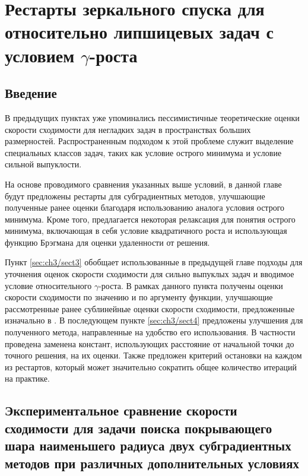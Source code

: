 \chapter{Рестарты зеркального спуска для относительно липшицевых задач с условием $\gamma$-роста}\label{ch:ch3}

\section{Введение}\label{sec:ch3/sect1}

    В предыдущих пунктах уже упоминались пессимистичные теоретические оценки скорости сходимости для негладких задач в пространствах больших размерностей. Распространенным подходом к этой проблеме служит выделение специальных классов задач, таких как условие острого минимума \cite{6, 1} и условие сильной выпуклости. 

    На основе проводимого сравнения указанных выше условий, в данной главе будут предложены рестарты для субградиентных методов, улучшающие полученные ранее оценки благодаря использованию аналога условия острого минимума.  Кроме того, предлагается некоторая релаксация для понятия острого минимума, включающая в себя условие квадратичного роста и использующая функцию Брэгмана для оценки удаленности от решения. 
    
    Пункт \ref{sec:ch3/sect3} обобщает использованные в предыдущей главе подходы для уточнения оценок скорости сходимости для сильно выпуклых задач и вводимое условие относительного $\gamma$-роста. В рамках данного пункта получены оценки скорости сходимости по значению и по аргументу функции, улучшающие рассмотренные ранее сублинейные оценки скорости сходимости, предложенные изначально в \cite{Bach_2012}. В последующем пункте \ref{sec:ch3/sect4} предложены улучшения для полученного метода, направленные на удобство его использования. В частности проведена заменена констант, использующих расстояние от начальной точки до точного решения, на их оценки. Также предложен критерий остановки на каждом из рестартов, который может значительно сократить общее количество итераций на практике.

 \section{Экспериментальное сравнение скорости сходимости для задачи поиска покрывающего шара наименьшего радиуса двух субградиентных методов при различных дополнительных условиях}  \label{sec:ch3/sec2}

